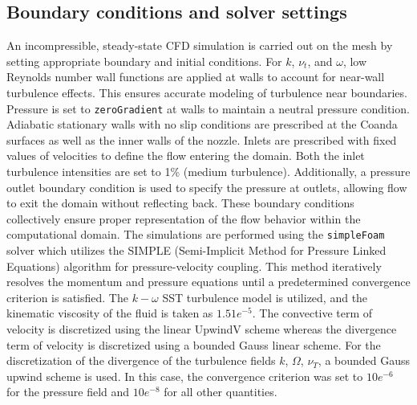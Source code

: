 \subsection{Boundary conditions and solver settings}
An incompressible, steady-state CFD simulation is carried out on the mesh by setting appropriate boundary and initial conditions. For $k$, $\nu_t$, and \( \omega \), low Reynolds number wall functions are applied at walls to account for near-wall turbulence effects. This ensures accurate modeling of turbulence near boundaries. Pressure is set to \verb|zeroGradient| at walls to maintain a neutral pressure condition. Adiabatic stationary walls with no slip conditions are prescribed at the Coanda surfaces as well as the inner walls of the nozzle. Inlets are prescribed with fixed values of velocities to define the flow entering the domain. Both the inlet turbulence intensities are set to 1\% (medium turbulence). Additionally, a pressure outlet boundary condition is used to specify the pressure at outlets, allowing flow to exit the domain without reflecting back. These boundary conditions collectively ensure proper representation of the flow behavior within the computational domain. The simulations are performed using the \verb|simpleFoam| solver which utilizes the SIMPLE (Semi-Implicit Method for Pressure Linked Equations) algorithm for pressure-velocity coupling. This method iteratively resolves the momentum and pressure equations until a predetermined convergence criterion is satisfied. The $k-\omega$ SST turbulence model is utilized, and the kinematic viscosity of the fluid is taken as $1.51e^{-5}$. The convective term of velocity is discretized using the linear UpwindV scheme whereas the divergence term of velocity is discretized using a bounded Gauss linear scheme. For the discretization of the divergence of the turbulence fields $k$, $\Omega$, $\nu_T$, a bounded Gauss upwind scheme is used. In this case, the convergence criterion was set to $10e^{-6}$ for the pressure field and $10e^{-8}$ for all other quantities. 
